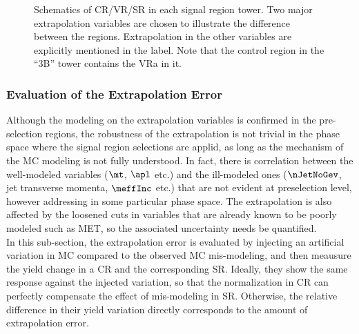 \begin{figure}[h]
 \caption{ Schematics of CR/VR/SR in each signal region tower. Two major extrapolation variables are chosen to illustrate the difference between the regions. Extrapolation in the other variables are explicitly mentioned in the label. Note that the control region in the ``3B'' tower contains the VRa in it. 
   \label{fig::BGestimation::regionsPlot} 
 }
\end{figure}

\clearpage

%


\subsubsection{Evaluation of the Extrapolation Error} \label{sec::BGestimation::nonClosure_kineExtp}
Although the modeling on the extrapolation variables is confirmed in the pre-selection regions, 
the robustness of the extrapolation is not trivial in the phase space where the signal region selections are applid,
as long as the mechanism of the MC modeling is not fully understood. 
In fact, there is correlation between the well-modeled variables ($\mt$, $\apl$ etc.) and the ill-modeled ones ($\nJetNoGev$, jet transverse momenta, $\meffInc$ etc.) that are not evident at preselection level, however addressing in some particular phase space. 
The extrapolation is also affected by the loosened cuts in variables that are already known to be poorly modeled such as MET, so the associated uncertainty needs be quantified. \\

In this sub-section, the extrapolation error is evaluated by injecting an artificial variation in MC compared to the observed MC mis-modeling, and then meausure the yield change in a CR and the corresponding SR. Ideally, they show the same response against the injected variation, so that the normalization in CR can perfectly compensate the effect of mis-modeling in SR. Otherwise, the relative difference in their yield variation directly corresponds to the amount of extrapolation error. \\

